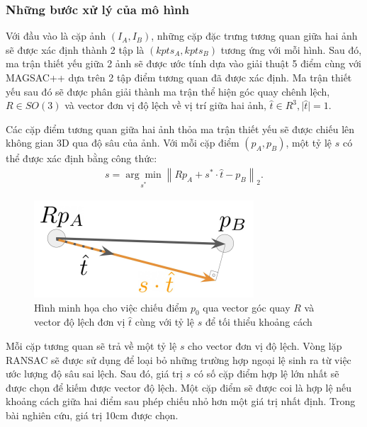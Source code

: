 \subsubsection*{Những bước xử lý của mô hình}

Với đầu vào là cặp ảnh $(I_A,I_B)$, những cặp đặc trưng tương quan giữa hai ảnh sẽ được xác định thành 2 tập là $(kpts_A, kpts_B)$ tương ứng với mỗi hình. Sau đó, ma trận thiết yếu giữa 2 ảnh sẽ được ước tính dựa vào giải thuật 5 điểm \cite{nister2004efficient} cùng với MAGSAC++ \cite{barath2020magsac++} dựa trên 2 tập điểm tương quan đã được xác định. Ma trận thiết yếu sau đó sẽ được phân giải thành ma trận thể hiện góc quay chênh lệch, $R \in SO(3)$ và vector đơn vị độ lệch về vị trí giữa hai ảnh, $\hat{t} \in R^{3}, \lvert \hat{t} \rvert = 1$.

Các cặp điểm tương quan giữa hai ảnh thỏa ma trận thiết yếu sẽ được chiếu lên không gian 3D qua độ sâu của ảnh. Với mỗi cặp điểm $(p_A,p_B)$, một tỷ lệ $s$ có thể được xác định bằng công thức:
$$
\begin{aligned}
    s=\underset{s^*}{\arg \min }\left\|R p_A+s^* \cdot \hat{t}-p_B\right\|_2 .
\end{aligned}
$$

\begin{figure}[H]
    \centering
    \includegraphics[scale=0.8]{pics/Proposal/reprojection.png}
    \caption[Minh họa cho việc xác định tỷ lệ $s$ bằng độ sâu ảnh]{Hình minh họa cho việc chiếu điểm $p_0$ qua vector góc quay $R$ và vector độ lệch đơn vị $\hat{t}$ cùng với tỷ lệ $s$ để tối thiểu khoảng cách \cite{arnold2022mapfree}}
\end{figure}


Mỗi cặp tương quan sẽ trả về một tỷ lệ $s$ cho vector đơn vị độ lệch. Vòng lặp RANSAC sẽ được sử dụng để loại bỏ những trường hợp ngoại lệ sinh ra từ việc ước lượng độ sâu sai lệch. Sau đó, giá trị $s$ có số cặp điểm hợp lệ lớn nhất sẽ được chọn để kiếm được vector độ lệch. Một cặp điểm sẽ được coi là hợp lệ nếu khoảng cách giữa hai điểm sau phép chiếu nhỏ hơn một giá trị nhất định. Trong bài nghiên cứu, giá trị 10cm được chọn.


